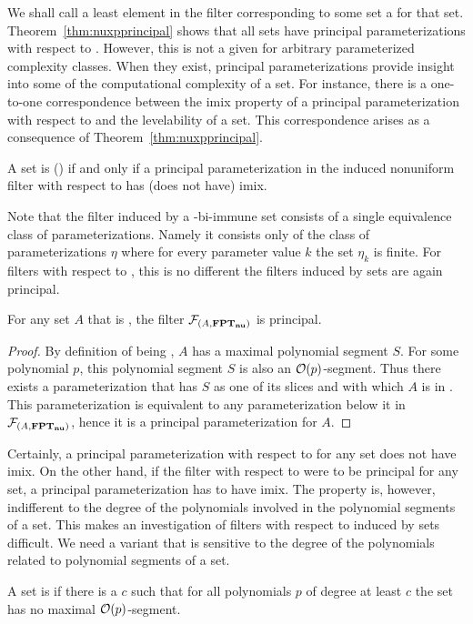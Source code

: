 We shall call a least element in the filter corresponding to some set a  for that set.
Theorem~\ref{thm:nuxpprincipal} shows that all sets have principal parameterizations with respect to .
However, this is not a given for arbitrary parameterized complexity classes.
When they exist, principal parameterizations provide insight into some of the computational complexity of a set.
For instance, there is a one-to-one correspondence between the imix property of a principal parameterization with respect to  and the levelability of a set.
This correspondence arises as a consequence of Theorem~\ref{thm:nuxpprincipal}.
\begin{corollary}
  A set is  () if and only if a principal parameterization in the induced nonuniform filter with respect to  has (does not have) imix.
\end{corollary}

Note that the filter induced by a -bi-immune set consists of a single equivalence class of parameterizations.
Namely it consists only of the class of parameterizations $\eta$ where for every parameter value $k$ the set $\eta_k$ is finite.
For filters with respect to , this is no different the filters induced by  sets are again principal.
\begin{theorem}
\label{thm:nufptprincipal}
  For any set $A$ that is , the filter $\mathcal{F}_{(A, \textnormal{\textbf{FPT$_\textbf{nu}$}})}$ is principal.
\end{theorem}
\begin{proof}
  By definition of being , $A$ has a maximal polynomial segment $S$.
  For some polynomial $p$, this polynomial segment $S$ is also an $\operatorname{\mathcal{O}}(p)$-segment.
  Thus there exists a parameterization that has $S$ as one of its slices and with which $A$ is in .
  This parameterization is equivalent to any parameterization below it in $\mathcal{F}_{(A, \textnormal{\textbf{FPT$_\textbf{nu}$}})}$, hence it is a principal parameterization for $A$.
\end{proof}

Certainly, a principal parameterization with respect to  for any  set does not have imix.
On the other hand, if the filter with respect to  were to be principal for any  set, a principal parameterization has to have imix.
The  property is, however, indifferent to the degree of the polynomials involved in the polynomial segments of a set.
This makes an investigation of filters with respect to  induced by  sets difficult.
We need a variant that is sensitive to the degree of the polynomials related to polynomial segments of a set.
\begin{definition}
  A set is  if there is a $c$ such that for all polynomials $p$ of degree at least $c$ the set has no maximal $\operatorname{\mathcal{O}}(p)$-segment.
\end{definition}


